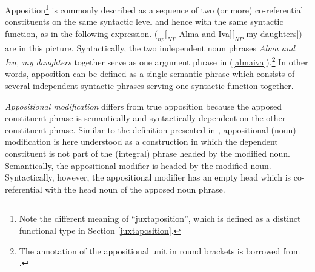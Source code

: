 Apposition\footnote{Note the different meaning of “juxtaposition”, which is defined as a distinct functional type in Section \ref{juxtaposition}.} is commonly described as a sequence of two (or more) co-referential constituents on the same syntactic level and hence with the same syntactic function, as in the following expression.
\ea
$(_{np} [_{NP}$ Alma and Iva$] [_{NP}$ my daughters$] )$ are in this picture. \label{almaiva}
\z
Syntactically, the two independent noun phrases \textit{Alma and Iva, my daughters} together serve as one argument phrase in (\ref{almaiva}).\footnote{The annotation of the appositional unit in round brackets is borrowed from \citet[21]{rijkhoff2002}.} In other words, apposition can be defined as a single semantic phrase which consists of several independent syntactic phrases serving one syntactic function together.

\emph{Appositional modification} differs from true apposition because the apposed constituent phrase is semantically and syntactically dependent on the other constituent phrase. Similar to the definition presented in \citet[22]{rijkhoff2002}, appositional (noun) modification is here understood as a construction in which the dependent constituent is not part of the (integral) phrase headed by the modified noun. Semantically, the appositional modifier is headed by the modified noun. Syntactically, however, the appositional modifier has an empty head which is co-referential with the head noun of the apposed noun phrase.

